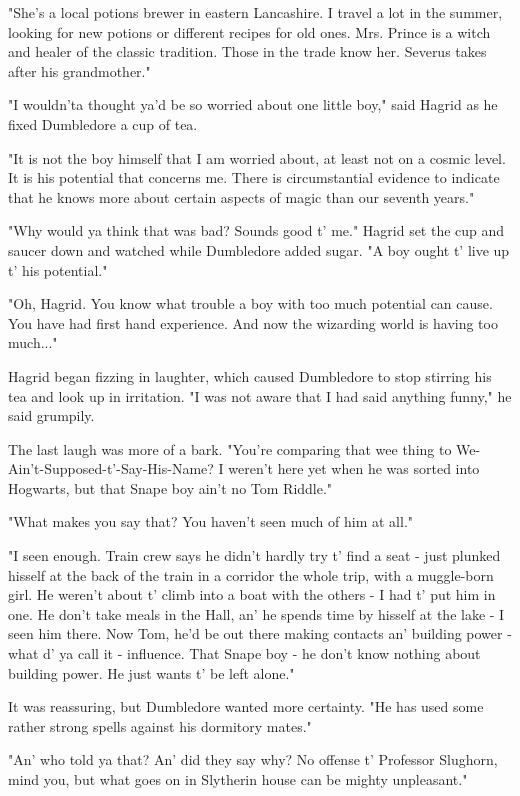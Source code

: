 \documentclass[a4paper,11pt]{article}
\begin{document}
"She's a local potions brewer in eastern Lancashire. I travel a lot in the summer, looking for new potions or different recipes for old ones. Mrs. Prince is a witch and healer of the classic tradition. Those in the trade know her. Severus takes after his grandmother."

"I wouldn'ta thought ya'd be so worried about one little boy," said Hagrid as he fixed Dumbledore a cup of tea.

"It is not the boy himself that I am worried about, at least not on a cosmic level. It is his potential that concerns me. There is circumstantial evidence to indicate that he knows more about certain aspects of magic than our seventh years."

"Why would ya think that was bad? Sounds good t' me." Hagrid set the cup and saucer down and watched while Dumbledore added sugar. "A boy ought t' live up t' his potential."

"Oh, Hagrid. You know what trouble a boy with too much potential can cause. You have had first hand experience. And now the wizarding world is having too much..."

Hagrid began fizzing in laughter, which caused Dumbledore to stop stirring his tea and look up in irritation. "I was not aware that I had said anything funny," he said grumpily.

The last laugh was more of a bark. "You're comparing that wee thing to We-Ain't-Supposed-t'-Say-His-Name? I weren't here yet when he was sorted into Hogwarts, but that Snape boy ain't no Tom Riddle."

"What makes you say that? You haven't seen much of him at all."

"I seen enough. Train crew says he didn't hardly try t' find a seat - just plunked hisself at the back of the train in a corridor the whole trip, with a muggle-born girl. He weren't about t' climb into a boat with the others - I had t' put him in one. He don't take meals in the Hall, an' he spends time by hisself at the lake - I seen him there. Now Tom, he'd be out there making contacts an' building power - what d' ya call it - influence. That Snape boy - he don't know nothing about building power. He just wants t' be left alone."

It was reassuring, but Dumbledore wanted more certainty. "He has used some rather strong spells against his dormitory mates."

"An' who told ya that? An' did they say why? No offense t' Professor Slughorn, mind you, but what goes on in Slytherin house can be mighty unpleasant."
\end{document}
